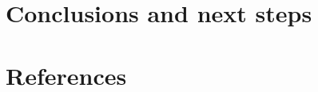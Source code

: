 \documentclass[11pt,]{article}
\begin{document}







\section{Conclusions and next steps}\label{sec:conclusions}







\newpage
\section*{References}

\end{document}
